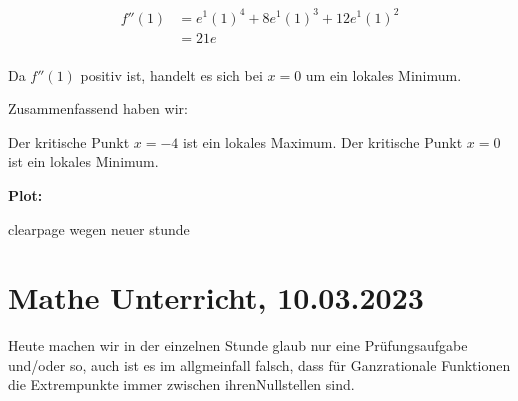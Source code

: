 \documentclass{report}
\begin{document}
\begin{align*}
f''(1) &= e^1 (1)^4 + 8 e^1 (1)^3 + 12 e^1 (1)^2 \\
&= 21e \\
\end{align*}

Da $f''(1)$ positiv ist, handelt es sich bei $x=0$ um ein lokales Minimum.

Zusammenfassend haben wir:

Der kritische Punkt $x=-4$ ist ein lokales Maximum.
Der kritische Punkt $x=0$ ist ein lokales Minimum.


\textbf{Plot:}



clearpage wegen neuer stunde
\clearpage

\section{Mathe Unterricht, 10.03.2023}
Heute machen wir in der einzelnen Stunde glaub nur eine Prüfungsaufgabe
und/oder so, auch ist es im allgmeinfall falsch, dass für Ganzrationale
Funktionen die Extrempunkte immer zwischen ihrenNullstellen sind.
\end{document}
